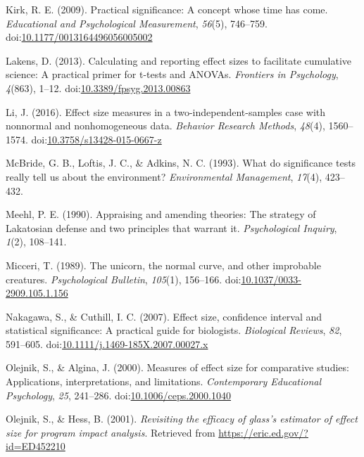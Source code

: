 \documentclass[
  man,floatsintext]{apa6}
\begin{document}
\leavevmode\hypertarget{ref-Kirk_2009}{}%
Kirk, R. E. (2009). Practical significance: A concept whose time has come. \emph{Educational and Psychological Measurement}, \emph{56}(5), 746--759. doi:\href{https://doi.org/10.1177/0013164496056005002\%20}{10.1177/0013164496056005002 }

\leavevmode\hypertarget{ref-Lakens_2013}{}%
Lakens, D. (2013). Calculating and reporting effect sizes to facilitate cumulative science: A practical primer for t-tests and ANOVAs. \emph{Frontiers in Psychology}, \emph{4}(863), 1--12. doi:\href{https://doi.org/10.3389/fpsyg.2013.00863}{10.3389/fpsyg.2013.00863}

\leavevmode\hypertarget{ref-Li_2016}{}%
Li, J. (2016). Effect size measures in a two-independent-samples case with nonnormal and nonhomogeneous data. \emph{Behavior Research Methods}, \emph{48}(4), 1560--1574. doi:\href{https://doi.org/10.3758/s13428-015-0667-z}{10.3758/s13428-015-0667-z}

\leavevmode\hypertarget{ref-McBride_et_al_1993}{}%
McBride, G. B., Loftis, J. C., \& Adkins, N. C. (1993). What do significance tests really tell us about the environment? \emph{Environmental Management}, \emph{17}(4), 423--432.

\leavevmode\hypertarget{ref-Meehl_1990}{}%
Meehl, P. E. (1990). Appraising and amending theories: The strategy of Lakatosian defense and two principles that warrant it. \emph{Psychological Inquiry}, \emph{1}(2), 108--141.

\leavevmode\hypertarget{ref-Micceri_1989}{}%
Micceri, T. (1989). The unicorn, the normal curve, and other improbable creatures. \emph{Psychological Bulletin}, \emph{105}(1), 156--166. doi:\href{https://doi.org/10.1037/0033-2909.105.1.156}{10.1037/0033-2909.105.1.156}

\leavevmode\hypertarget{ref-Nakagawa_and_Cuthill_2007}{}%
Nakagawa, S., \& Cuthill, I. C. (2007). Effect size, confidence interval and statistical significance: A practical guide for biologists. \emph{Biological Reviews}, \emph{82}, 591--605. doi:\href{https://doi.org/10.1111/j.1469-185X.2007.00027.x}{10.1111/j.1469-185X.2007.00027.x}

\leavevmode\hypertarget{ref-Olejnik_Algina_2000}{}%
Olejnik, S., \& Algina, J. (2000). Measures of effect size for comparative studies: Applications, interpretations, and limitations. \emph{Contemporary Educational Psychology}, \emph{25}, 241--286. doi:\href{https://doi.org/10.1006/ceps.2000.1040}{10.1006/ceps.2000.1040}

\leavevmode\hypertarget{ref-Olejnik_Hess_2001}{}%
Olejnik, S., \& Hess, B. (2001). \emph{Revisiting the efficacy of glass's estimator of effect size for program impact analysis}. Retrieved from \url{https://eric.ed.gov/?id=ED452210}
\end{document}

